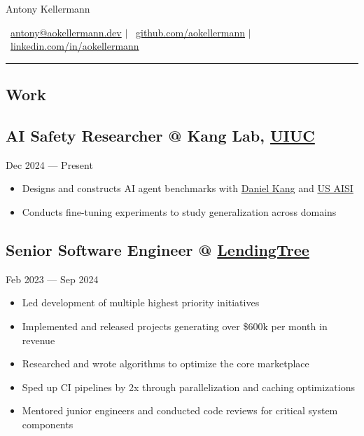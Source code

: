 \documentclass[11pt, letterpaper]{article}
\newcommand{\datedsubsection}[2]{
    \titleformat{\subsection}[runin]{\normalfont\normalsize\bfseries}{\thesection}{}{}
    \subsection*{#1}
    \hfill#2
    \titleformat{\subsection}[hang]{\normalfont\normalsize\bfseries}{\thesection}{}{}
}
\begin{document}
\pagestyle{empty}

\setlength{\parindent}{0pt}


\begin{center}
    \textcolor{header}{\huge{Antony Kellermann}}

    \bigskip

    \faEnvelope[regular]\ \href{mailto:antony@aokellermann.dev}{antony@aokellermann.dev}
    $|$
    \faGithub\ \href{https://github.com/aokellermann}{github.com/aokellermann}
    $|$
    \faLinkedinIn\ \href{https://linkedin.com/in/aokellermann}{linkedin.com/in/aokellermann}
\end{center}

\vspace{0.5em}\rule{\textwidth}{0.4pt}\vspace{1em}


\textcolor{header}{\section*{Work}}\label{sec:work}

\datedsubsection{AI Safety Researcher @ Kang Lab, \href{https://illinois.edu/}{UIUC}}{Dec 2024 --- Present}
\begin{itemize}
    \item Designs and constructs AI agent benchmarks with \href{https://ddkang.github.io/}{Daniel Kang} and \href{https://www.nist.gov/aisi}{US AISI}
    \item Conducts fine-tuning experiments to study generalization across domains
\end{itemize}

\datedsubsection{Senior Software Engineer @ \href{https://www.crunchbase.com/organization/lendingtree}{LendingTree}}{Feb 2023 --- Sep 2024}
\begin{itemize}
    \item Led development of multiple highest priority initiatives
    \item Implemented and released projects generating over \$600k per month in revenue
    \item Researched and wrote algorithms to optimize the core marketplace
    \item Sped up CI pipelines by 2x through parallelization and caching optimizations
    \item Mentored junior engineers and conducted code reviews for critical system components
\end{itemize}
\end{document}

